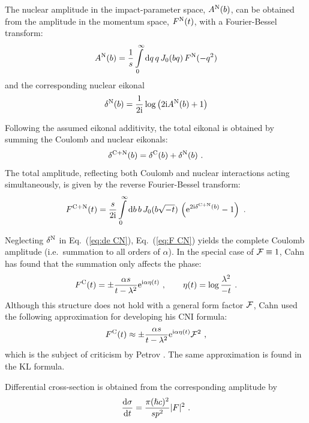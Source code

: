\documentclass{appolb}
\def\d{{\rm d}}
\def\e{{\rm e}}
\def\I{{\rm i}}
\begin{document}
The nuclear amplitude in the impact-parameter space, $A^{\rm N}(b)$, can be obtained from the amplitude in the momentum space, $F^{\rm N}(t)$, with a Fourier-Bessel transform:
\begin{equation}
A^{\rm N}(b) = {1\over s} \int\limits_0^\infty \d q\, q\, J_0(bq)\, F^{\rm N}(-q^2)
\label{eq:A N}
\end{equation}
and the corresponding nuclear eikonal
\begin{equation}
\delta^{\rm N}(b) = {1\over 2\I} \log\left( 2\I A^{\rm N}(b) + 1\right)
\label{eq:de N}
\end{equation}

Following the assumed eikonal additivity, the total eikonal is obtained by summing the Coulomb and nuclear eikonals:
\begin{equation}
\delta^{\rm C+N}(b) = \delta^{\rm C}(b) + \delta^{\rm N}(b)\ .
\label{eq:de CN}
\end{equation}
The total amplitude, reflecting both Coulomb and nuclear interactions acting simultaneously, is given by the reverse Fourier-Bessel transform:
\begin{equation}
F^{\rm C+N}(t) = {s\over 2\I} \int
\limits
_0^\infty 
\d b\, b\,J_0(b\sqrt{-t})\,\left( \e^{2\I \delta^{\rm C+N}(b)} - 1 \right)\ .
\label{eq:F CN}
\end{equation}

Neglecting $\delta^{\rm N}$ in Eq.~(\ref{eq:de CN}), Eq.~(\ref{eq:F CN}) yields the complete Coulomb amplitude (i.e.~summation to all orders of $\alpha$). In the special case of ${\cal F} \equiv 1$, Cahn has found that the summation only affects the phase:
\begin{equation}
F^{\rm C}(t) = \pm {\alpha s\over t - \lambda^2} \e^{\I\alpha \eta(t)}\ ,\qquad \eta(t) = \log {\lambda^2\over -t}\ .
\label{eq:F C comp}
\end{equation}
Although this structure does not hold with a general form factor ${\cal F}$, Cahn used the following approximation for developing his CNI formula:
\begin{equation}
F^{\rm C}(t) \approx \pm {\alpha s\over t - \lambda^2} \e^{\I\alpha \eta(t)} {\cal F}^2  \ ,
\label{eq:F C comp ff}
\end{equation}
which is the subject of criticism by Petrov \cite{petrov2018}. The same approximation is found in the KL formula.

Differential cross-section is obtained from the corresponding amplitude by
\begin{equation}
{\d\sigma\over\d t} = {\pi(\hslash c)^2\over s p^2} |F|^2\ .
\label{eq:cs}
\end{equation}
\end{document}
